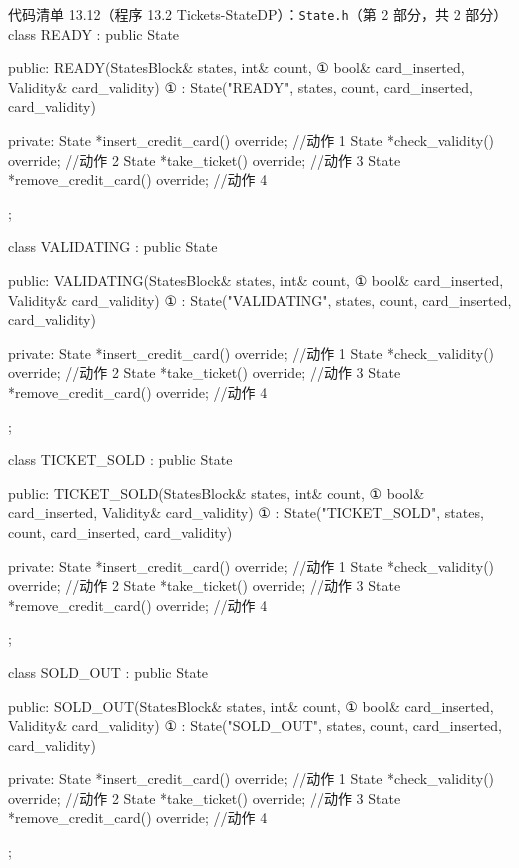 \begin{codeboxt}{代码清单 13.12（程序 13.2 Tickets-StateDP）：\texttt{State.h}（第 2 部分，共 2 部分）}
class READY : public State
{
public:
    READY(StatesBlock& states, int& count,                   ①
          bool& card_inserted, Validity& card_validity)      ①
        : State("READY", states, count,
                card_inserted, card_validity) {}

private:
    State *insert_credit_card() override;  //动作 1
    State *check_validity()     override;  //动作 2
    State *take_ticket()        override;  //动作 3
    State *remove_credit_card() override;  //动作 4
};

class VALIDATING : public State
{
public:
    VALIDATING(StatesBlock& states, int& count,               ①
               bool& card_inserted, Validity& card_validity)  ①
        : State("VALIDATING", states, count,
                card_inserted, card_validity) {}

private:
    State *insert_credit_card() override;  //动作 1
    State *check_validity()     override;  //动作 2
    State *take_ticket()        override;  //动作 3
    State *remove_credit_card() override;  //动作 4
};

class TICKET_SOLD : public State
{
public:
    TICKET_SOLD(StatesBlock& states, int& count,              ①
                bool& card_inserted, Validity& card_validity) ①
        : State("TICKET_SOLD", states, count,
                card_inserted, card_validity) {}

private:
    State *insert_credit_card() override;  //动作 1
    State *check_validity()     override;  //动作 2
    State *take_ticket()        override;  //动作 3
    State *remove_credit_card() override;  //动作 4
};

class SOLD_OUT : public State
{
public:
    SOLD_OUT(StatesBlock& states, int& count,                 ①
             bool& card_inserted, Validity& card_validity)    ①
        : State("SOLD_OUT", states, count,
                card_inserted, card_validity) {}

private:
    State *insert_credit_card() override;  //动作 1
    State *check_validity()     override;  //动作 2
    State *take_ticket()        override;  //动作 3
    State *remove_credit_card() override;  //动作 4
};
\end{codeboxt}
\par


